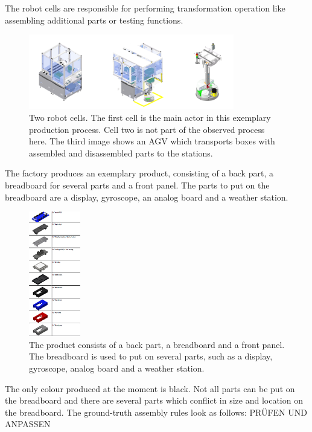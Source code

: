 The robot cells are responsible for performing transformation operation like assembling additional parts or testing functions.

\begin{figure}[htbp]
  \centering
  \includegraphics[width=0.8\textwidth]{figures/robots.png}
  \caption{Two robot cells. The first cell is the main actor in this exemplary production process. Cell two is not part of the observed process here. The third image shows an AGV which transports boxes with assembled and disassembled parts to the stations.}
  \label{fig:robots}
\end{figure}

The factory produces an exemplary product, consisting of a back part, a breadboard for several parts and a front panel. The parts to put on the breadboard are a display, gyroscope, an analog board and a weather station.

\begin{figure}[htbp]
  \centering
  \includegraphics[width=0.2\textwidth]{figures/parts.png}
  \caption{The product consists of a back part, a breadboard and a front panel. The breadboard is used to put on several parts, such as a display, gyroscope, analog board and a weather station.}
  \label{fig:iotproduct}
\end{figure}

The only colour produced at the moment is black. Not all parts can be put on the breadboard and there are several parts which conflict in size and location on the breadboard. The ground-truth assembly rules look as follows:
PRÜFEN UND ANPASSEN

